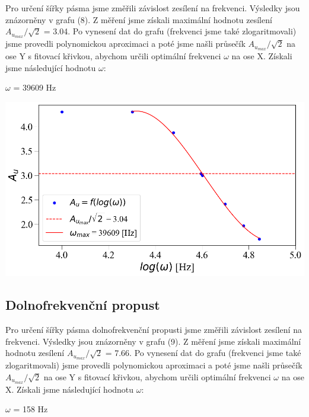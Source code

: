 \documentclass[a4paper,11pt]{article}
\begin{document}
    \begin{minipage}[t]{0.5\textwidth}  
                Pro určení šířky pásma jsme změřili závislost zesílení na frekvenci. Výsledky jsou znázorněny v grafu (8). Z měření jsme získali maximální hodnotu zesílení $A_{u_{max}}/\sqrt{2}$ = 3.04. Po vynesení dat do grafu (frekvenci jsme také zlogaritmovali) jsme provedli polynomickou aproximaci a poté jsme našli průsečík $A_{u_{max}}/\sqrt{2}$ na ose Y s fitovací křivkou, abychom určili optimální frekvenci $\omega$ na ose X. Získali jsme následující hodnotu $\omega$:
                \begin{center}
                    $\omega$ = 39609 Hz 
                \end{center}

                \vspace{10pt}           
                \par \centering
                \includegraphics[scale=0.32]{inv_freq}
                \captionsetup{justification=centering, font=footnotesize}
                \label{fig:inv_freq}
                \vspace{10pt}
                \raggedright

            \subsection{Dolnofrekvenční propust}
                Pro určení šířky pásma dolnofrekvenční propusti jsme změřili závislost zesílení na frekvenci. Výsledky jsou znázorněny v grafu (9). Z měření jsme získali maximální hodnotu zesílení $A_{u_{max}}/\sqrt{2}$ = 7.66. Po vynesení dat do grafu (frekvenci jsme také zlogaritmovali) jsme provedli polynomickou aproximaci a poté jsme našli průsečík $A_{u_{max}}/\sqrt{2}$ na ose Y s fitovací křivkou, abychom určili optimální frekvenci $\omega$ na ose X. Získali jsme následující hodnotu $\omega$:
                \begin{center}
                    $\omega$ = 158 Hz
                \end{center}


\end{minipage}
\end{document}
